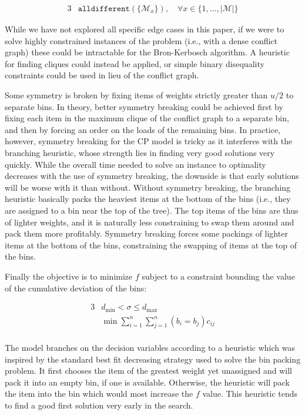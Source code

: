 \documentclass{llncs}
\begin{document}
\begin{alignat}{3}
  & \texttt{alldifferent}\left( \{\mathcal{M}_{x}\} \right), \quad \forall x \in \{1, \dots, |\mathcal{M}|\}
\end{alignat}

While we have not explored all specific edge cases in this paper, if we were to solve highly constrained instances of the problem (i.e., with a dense conflict graph) these could be intractable for the Bron-Kerbosch algorithm. A heuristic for finding cliques could instead be applied, or simple binary disequality constraints could be used in lieu of the conflict graph.


Some symmetry is broken by fixing items of weights strictly greater than $u/2$ to separate bins. In theory, better symmetry breaking could be achieved first by fixing each item in the maximum clique of the conflict graph to a separate bin, and then by forcing an order on the loads of the remaining bins. In practice, however, symmetry breaking for the CP model is tricky as it interferes with the branching heuristic, whose strength lies in finding very good solutions very quickly. While the overall time needed to solve an instance to optimality decreases with the use of symmetry breaking, the downside is that early solutions will be worse with it than without. Without symmetry breaking, the branching heuristic basically packs the heaviest items at the bottom of the bins (i.e., they are assigned to a bin near the top of the tree). The top items of the bins are thus of lighter weights, and it is naturally less constraining to swap them around and pack them more profitably. Symmetry breaking forces some packings of lighter items at the bottom of the bins, constraining the swapping of items at the top of the bins.

Finally the objective is to minimize $f$ subject to a constraint bounding the value of the cumulative deviation of the bins:

\begin{alignat}{3}
  & d_{\min} < \sigma \leq d_{\max} \\
  & \min \sum\limits_{i=1}^{n} \sum\limits_{j=1}^{n} \left( b_{i} = b_{j} \right) c_{ij}
\end{alignat}

\paragraph{}The model branches on the decision variables according to a heuristic which was inspired by the standard best fit decreasing strategy used to solve the bin packing problem. It first chooses the item of the greatest weight yet unassigned and will pack it into an empty bin, if one is available. Otherwise, the heuristic will pack the item into the bin which would most increase the $f$ value. This heuristic tends to find a good first solution very early in the search.
\end{document}
